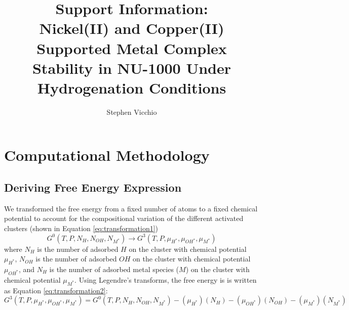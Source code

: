 \documentclass[12pt]{article}
\title{Support Information: \\
Nickel(II) and Copper(II) Supported Metal Complex Stability in NU-1000 Under Hydrogenation Conditions}
\author{Stephen Vicchio}
\begin{document}
\maketitle


\section{Computational Methodology}
\subsection{Deriving Free Energy Expression}
We transformed the free energy from a fixed number of atoms to a fixed chemical potential to account for the compositional variation of the different activated clusters (shown in Equation \ref{eq:transformation1})
\begin{equation}
    G^{0}(T,P,N_{H},N_{OH},N_{M^{*}}) \rightarrow G^{3}(T,P,\mu_{H^{*}},\mu_{OH^{*}},\mu_{M^{*}})
    \label{eq:transformation1}
\end{equation}
where $N_{H}$ is the number of adsorbed $H$ on the cluster with chemical potential $\mu_{H^{*}}$, $N_{OH}$ is the number of adsorbed $OH$ on the cluster with chemical potential $\mu_{OH^{*}}$, and $N_{H}$ is the number of adsorbed metal species ($M$) on the cluster with chemical potential $\mu_{M^{*}}$. Using Legendre's transforms, the free energy is is written as Equation \ref{eq:transformation2}:
\begin{equation}
    G^{3}(T,P,\mu_{H^{*}},\mu_{OH^{*}},\mu_{M^{*}}) = G^{0}(T,P,N_{H},N_{OH},N_{M^{*}}) - (\mu_{H^{*}})(N_{H}) - (\mu_{OH^{*}})(N_{OH}) - (\mu_{M^{*}})(N_{M^{*}})  
    \label{eq:transformation2}
\end{equation}
\end{document}
